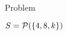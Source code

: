 \documentclass[10pt]{article}
\begin{document}
\begin{hwsolution}{1}

    \hwplaceholder
\end{hwsolution}



\begin{hwproblem}{2}
    Problem
\end{hwproblem}

\begin{hwsolution}{2}
    $S=\mathcal{P}\mathopen{}\left({\mathopen{}\left\{{4,8,k}\right\}\mathclose{}}\right)\mathclose{}$
    \hwplaceholder
\end{hwsolution}


\end{document}
